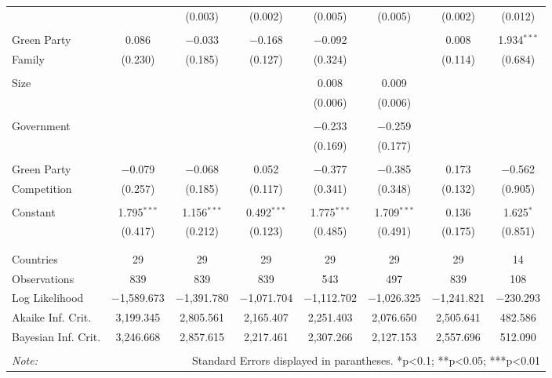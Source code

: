 \begin{tabular}{@{\extracolsep{5pt}}lccccccc}
  &  & (0.003) & (0.002) & (0.005) & (0.005) & (0.002) & (0.012) \\ 
  & & & & & & & \\ 
 Green Party & 0.086 & $-$0.033 & $-$0.168 & $-$0.092 &  & 0.008 & 1.934$^{***}$ \\ 
 Family & (0.230) & (0.185) & (0.127) & (0.324) &  & (0.114) & (0.684) \\ 
  & & & & & & & \\ 
 Size &  &  &  & 0.008 & 0.009 &  &  \\ 
  &  &  &  & (0.006) & (0.006) &  &  \\ 
  & & & & & & & \\ 
 Government &  &  &  & $-$0.233 & $-$0.259 &  &  \\ 
  &  &  &  & (0.169) & (0.177) &  &  \\ 
  & & & & & & & \\ 
 Green Party & $-$0.079 & $-$0.068 & 0.052 & $-$0.377 & $-$0.385 & 0.173 & $-$0.562 \\ 
 Competition & (0.257) & (0.185) & (0.117) & (0.341) & (0.348) & (0.132) & (0.905) \\ 
  & & & & & & & \\ 
 Constant & 1.795$^{***}$ & 1.156$^{***}$ & 0.492$^{***}$ & 1.775$^{***}$ & 1.709$^{***}$ & 0.136 & 1.625$^{*}$ \\ 
  & (0.417) & (0.212) & (0.123) & (0.485) & (0.491) & (0.175) & (0.851) \\ 
  & & & & & & & \\ 
\hline \\[-1.8ex] 
Countries & 29 & 29 & 29 & 29 & 29 & 29 & 14 \\ 
Observations & 839 & 839 & 839 & 543 & 497 & 839 & 108 \\ 
Log Likelihood & $-$1,589.673 & $-$1,391.780 & $-$1,071.704 & $-$1,112.702 & $-$1,026.325 & $-$1,241.821 & $-$230.293 \\ 
Akaike Inf. Crit. & 3,199.345 & 2,805.561 & 2,165.407 & 2,251.403 & 2,076.650 & 2,505.641 & 482.586 \\ 
Bayesian Inf. Crit. & 3,246.668 & 2,857.615 & 2,217.461 & 2,307.266 & 2,127.153 & 2,557.696 & 512.090 \\ 
\hline 
\hline \\[-1.8ex] 
\textit{Note:}  & \multicolumn{7}{r}{Standard Errors displayed in parantheses. *p<0.1; **p<0.05; ***p<0.01} \\ 
\end{tabular} 
